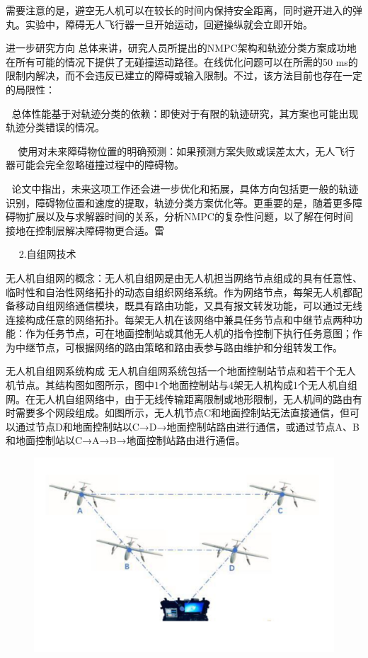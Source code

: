 \documentclass{article}
\begin{document}
需要注意的是，避空无人机可以在较长的时间内保持安全距离，同时避开进入的弹丸。实验中，障碍无人飞行器一旦开始运动，回避操纵就会立即开始。\par
进一步研究方向
总体来讲，研究人员所提出的NMPC架构和轨迹分类方案成功地在所有可能的情况下提供了无碰撞运动路径。在线优化问题可以在所需的50 ms的限制内解决，而不会违反已建立的障碍或输入限制。不过，该方法目前也存在一定的局限性：\par

总体性能基于对轨迹分类的依赖：即使对于有限的轨迹研究，其方案也可能出现轨迹分类错误的情况。\par


使用对未来障碍物位置的明确预测：如果预测方案失败或误差太大，无人飞行器可能会完全忽略碰撞过程中的障碍物。\par

论文中指出，未来这项工作还会进一步优化和拓展，具体方向包括更一般的轨迹识别，障碍物位置和速度的提取，轨迹分类方案优化等。更重要的是，随着更多障碍物扩展以及与求解器时间的关系，分析NMPC的复杂性问题，以了解在何时间接地在控制层解决障碍物更合适。雷\par
　
2.自组网技术\citep{5}\par 
无人机自组网的概念：无人机自组网是由无人机担当网络节点组成的具有任意性、临时性和自治性网络拓扑的动态自组织网络系统。作为网络节点，每架无人机都配备移动自组网络通信模块，既具有路由功能，又具有报文转发功能，可以通过无线连接构成任意的网络拓扑。每架无人机在该网络中兼具任务节点和中继节点两种功能：作为任务节点，可在地面控制站或其他无人机的指令控制下执行任务意图；作为中继节点，可根据网络的路由策略和路由表参与路由维护和分组转发工作。\par
无人机自组网系统构成 无人机自组网系统包括一个地面控制站节点和若干个无人机节点。其结构图如图所示，图中1个地面控制站与4架无人机构成1个无人机自组网。在无人机自组网络中，由于无线传输距离限制或地形限制，无人机间的路由有时需要多个网段组成。如图所示，无人机节点C和地面控制站无法直接通信，但可以通过节点D和地面控制站以C→D→地面控制站路由进行通信，或通过节点A、B和地面控制站以C→A→B→地面控制站路由进行通信。\par

\par
\begin{figure}[h!]
\centering
\includegraphics[scale=0.5]{9}
\label{fig:9}
\end{figure}
       
\end{document}
